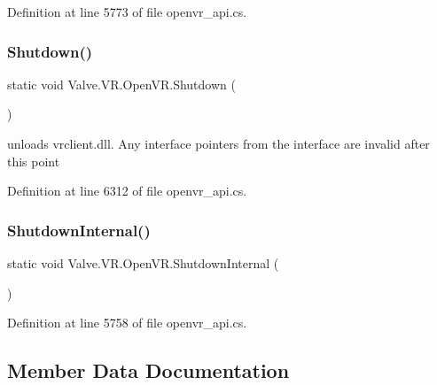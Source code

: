 Definition at line 5773 of file openvr\+\_\+api.\+cs.

\mbox{\label{class_valve_1_1_v_r_1_1_open_v_r_ad6faa1cc3961054643901552c4ab17ba}} 
\subsubsection{\texorpdfstring{Shutdown()}{Shutdown()}}
{\footnotesize\ttfamily static void Valve.\+V\+R.\+Open\+V\+R.\+Shutdown (\begin{DoxyParamCaption}{ }\end{DoxyParamCaption})\hspace{0.3cm}{\ttfamily [static]}}

unloads vrclient.\+dll. Any interface pointers from the interface are invalid after this point 

Definition at line 6312 of file openvr\+\_\+api.\+cs.

\mbox{\label{class_valve_1_1_v_r_1_1_open_v_r_a65b9b06b7064db76e2e2db9de9e09083}} 
\subsubsection{\texorpdfstring{ShutdownInternal()}{ShutdownInternal()}}
{\footnotesize\ttfamily static void Valve.\+V\+R.\+Open\+V\+R.\+Shutdown\+Internal (\begin{DoxyParamCaption}{ }\end{DoxyParamCaption})\hspace{0.3cm}{\ttfamily [static]}}



Definition at line 5758 of file openvr\+\_\+api.\+cs.



\subsection{Member Data Documentation}
\mbox{\label{class_valve_1_1_v_r_1_1_open_v_r_a6e13b8af1718799a500a327fa54159f8}} 
